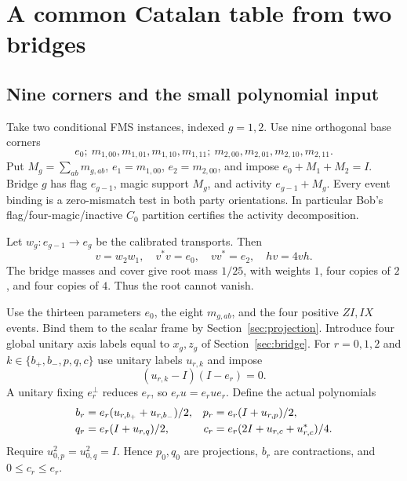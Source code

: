 \section{A common Catalan table from two bridges}\label{sec:assembly}
\subsection{Nine corners and the small polynomial input}
Take two conditional FMS instances, indexed $g=1,2$. Use nine orthogonal base corners
\[
 e_0;\ m_{1,00},m_{1,01},m_{1,10},m_{1,11};\
 m_{2,00},m_{2,01},m_{2,10},m_{2,11}.
\]
Put $M_g=\sum_{ab}m_{g,ab}$, $e_1=m_{1,00}$, $e_2=m_{2,00}$, and impose $e_0+M_1+M_2=I$. Bridge $g$ has flag $e_{g-1}$, magic support $M_g$, and activity $e_{g-1}+M_g$. Every event binding is a zero-mismatch test in both party orientations. In particular Bob's flag/four-magic/inactive $C_0$ partition certifies the activity decomposition.

Let $w_g:e_{g-1}\to e_g$ be the calibrated transports. Then
\begin{equation}\label{eq:v}
 v=w_2w_1,\quad v^*v=e_0,\quad vv^*=e_2,\quad hv=4vh.
\end{equation}
The bridge masses and cover give root mass $1/25$, with weights $1$, four copies of $2$, and four copies of $4$. Thus the root cannot vanish.

Use the thirteen parameters $e_0$, the eight $m_{g,ab}$, and the four positive $ZI,IX$ events. Bind them to the scalar frame by Section~\ref{sec:projection}. Introduce four global unitary axis labels equal to $x_g,z_g$ of Section~\ref{sec:bridge}. For $r=0,1,2$ and $k\in\{b_+,b_-,p,q,c\}$ use unitary labels $u_{r,k}$ and impose
\begin{equation}\label{eq:P1}
 (u_{r,k}-I)(I-e_r)=0.
\end{equation}
A unitary fixing $e_r^\perp$ reduces $e_r$, so $e_ru=e_rue_r$. Define the actual polynomials
\begin{align}
 b_r&=e_r(u_{r,b_+}+u_{r,b_-})/2,&
 p_r&=e_r(I+u_{r,p})/2,\label{eq:definitions}\\
 q_r&=e_r(I+u_{r,q})/2,&
 c_r&=e_r(2I+u_{r,c}+u_{r,c}^*)/4.\notag
\end{align}
Require $u_{0,p}^2=u_{0,q}^2=I$. Hence $p_0,q_0$ are projections, $b_r$ are contractions, and $0\leq c_r\leq e_r$.


